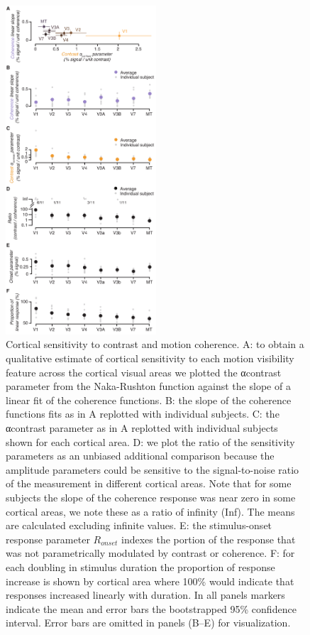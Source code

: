 \documentclass{report}
\begin{document}
\begin{figure}
\centering
\includegraphics[keepaspectratio,width=0.5\textwidth]{figs_c1/Fig6_sensitivity.pdf}
\caption[Cortical sensitivity to contrast and motion coherence]{Cortical sensitivity to contrast and motion coherence. A: to obtain a qualitative estimate of cortical sensitivity to each motion visibility feature across the cortical visual areas we plotted the αcontrast parameter from the Naka-Rushton function against the slope of a linear fit of the coherence functions. B: the slope of the coherence functions fits as in A replotted with individual subjects. C: the αcontrast parameter as in A replotted with individual subjects shown for each cortical area. D: we plot the ratio of the sensitivity parameters as an unbiased additional comparison because the amplitude parameters could be sensitive to the signal-to-noise ratio of the measurement in different cortical areas. Note that for some subjects the slope of the coherence response was near zero in some cortical areas, we note these as a ratio of infinity (Inf). The means are calculated excluding infinite values. E: the stimulus-onset response parameter $R_{onset}$ indexes the portion of the response that was not parametrically modulated by contrast or coherence. F: for each doubling in stimulus duration the proportion of response increase is shown by cortical area where 100\% would indicate that responses increased linearly with duration. In all panels markers indicate the mean and error bars the bootstrapped 95\% confidence interval. Error bars are omitted in panels (B–E) for visualization.}
\label{fig:c1f6}
\end{figure}
\end{document}
